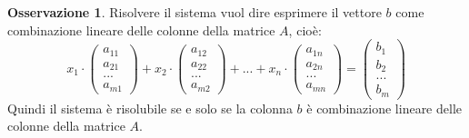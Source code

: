 \documentclass[a4paper]{article}
\theoremstyle{definition}
\newtheorem*{oss}{Osservazione}
\begin{document}
	\begin{oss}
		Risolvere il sistema vuol dire esprimere il vettore $b$ come combinazione lineare delle colonne della matrice $A$, cioè:
		\begin{equation*}
			x_1 \cdot \begin{pmatrix}
				a_{11} \\
				a_{21} \\
				... \\
				a_{m1}
			\end{pmatrix} + x_2 \cdot \begin{pmatrix}
				a_{12} \\
				a_{22} \\
				... \\
				a_{m2}
			\end{pmatrix} + ... + x_n \cdot \begin{pmatrix}
				a_{1n} \\
				a_{2n} \\
				... \\
				a_{mn}
			\end{pmatrix} = \begin{pmatrix}
				b_1 \\
				b_2 \\
				... \\
				b_m
			\end{pmatrix}
		\end{equation*}
		Quindi il sistema è risolubile se e solo se la colonna $b$ è combinazione lineare delle colonne della matrice $A$.
	\end{oss}
\end{document}
